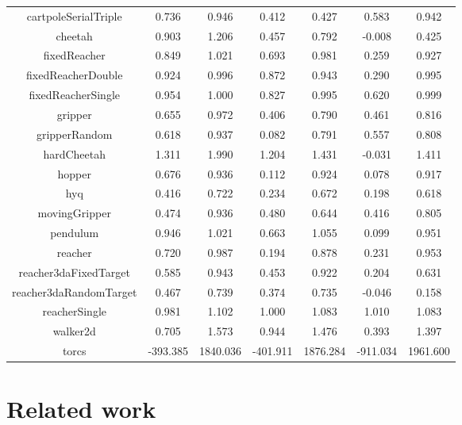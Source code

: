 \documentclass{article} \usepackage{iclr2016_conference,times}
\begin{document}
\begin{table}[t]
\begin{center}
\begin{tabular}{ c | c | c | c | c | c | c }
cartpoleSerialTriple & 0.736 & 0.946 & 0.412 & 0.427 & 0.583 & 0.942 \\
cheetah & 0.903 & 1.206 & 0.457 & 0.792 & -0.008 & 0.425 \\
fixedReacher & 0.849 & 1.021 & 0.693 & 0.981 & 0.259 & 0.927 \\
fixedReacherDouble & 0.924 & 0.996 & 0.872 & 0.943 & 0.290 & 0.995 \\
fixedReacherSingle & 0.954 & 1.000 & 0.827 & 0.995 & 0.620 & 0.999 \\
gripper & 0.655 & 0.972 & 0.406 & 0.790 & 0.461 & 0.816 \\
gripperRandom & 0.618 & 0.937 & 0.082 & 0.791 & 0.557 & 0.808 \\
hardCheetah & 1.311 & 1.990 & 1.204 & 1.431 & -0.031 & 1.411 \\
hopper & 0.676 & 0.936 & 0.112 & 0.924 & 0.078 & 0.917 \\
hyq & 0.416 & 0.722 & 0.234 & 0.672 & 0.198 & 0.618 \\
movingGripper & 0.474 & 0.936 & 0.480 & 0.644 & 0.416 & 0.805 \\
pendulum & 0.946 & 1.021 & 0.663 & 1.055 & 0.099 & 0.951 \\
reacher & 0.720 & 0.987 & 0.194 & 0.878 & 0.231 & 0.953 \\
reacher3daFixedTarget & 0.585 & 0.943 & 0.453 & 0.922 & 0.204 & 0.631 \\
reacher3daRandomTarget & 0.467 & 0.739 & 0.374 & 0.735 & -0.046 & 0.158 \\
reacherSingle & 0.981 & 1.102 & 1.000 & 1.083 & 1.010 & 1.083 \\
walker2d & 0.705 & 1.573 & 0.944 & 1.476 & 0.393 & 1.397 \\
      \hline
      torcs & -393.385 & 1840.036 & -401.911 & 1876.284 & -911.034 & 1961.600 \\
\end{tabular}
\end{center}
\end{table}







\section{Related work}
\end{document}
